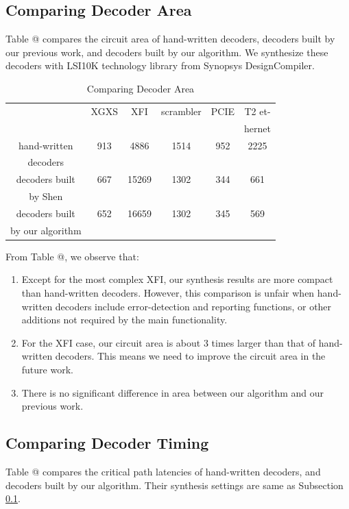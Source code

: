 \documentclass[journal]{IEEEtran}
\makeatletter
\newcommand{\Rmnum}[1]{\expandafter\@slowromancap\romannumeral #1@}
\makeatother
\begin{document}
\subsection{Comparing Decoder Area}\label{subsec_area}

Table \Rmnum{4} compares the circuit area of hand-written decoders,
decoders built by our previous work\cite{ShegnYuShen:iccad09},
and decoders built by our algorithm.
We synthesize these decoders with LSI10K technology library from Synopsys DesignCompiler.

\begin{table}[!t]
\centering
\caption{Comparing Decoder Area}
\begin{tabular}{|c|c|c|c|c|c|}
\hline
&XGXS&XFI&scrambler&PCIE&T2 et-\\
&&&&&hernet\\ \hline
hand-written      &913       &4886     &1514         &952   &2225          \\
decoders          &&&&&\\ \hline
decoders built     &667       &15269     &1302         &344   &661          \\
by Shen\cite{ShegnYuShen:iccad09}   &&&&&\\ \hline
decoders built     &652       &16659     &1302         &345   &569          \\
by our algorithm   &&&&&\\ \hline
\end{tabular}
\end{table}

From Table \Rmnum{4},
we observe that:
\begin{enumerate}
\item Except for the most complex XFI, our synthesis results
are more compact than hand-written decoders. However,
this comparison is unfair when hand-written decoders
include error-detection and reporting functions, or other
additions not required by the main functionality.
\item For the XFI case,
our circuit area is about 3 times larger than that of hand-written decoders.
This means we need to improve the circuit area in the future work.
\item There is no significant difference in area between our algorithm and our previous work\cite{ShegnYuShen:iccad09}.
\end{enumerate}

\subsection{Comparing Decoder Timing}\label{subsec_timing}
Table \Rmnum{5} compares the critical path latencies of hand-written decoders,
and decoders built by our algorithm.
Their synthesis settings are same as Subsection \ref{subsec_area}.
\end{document}
